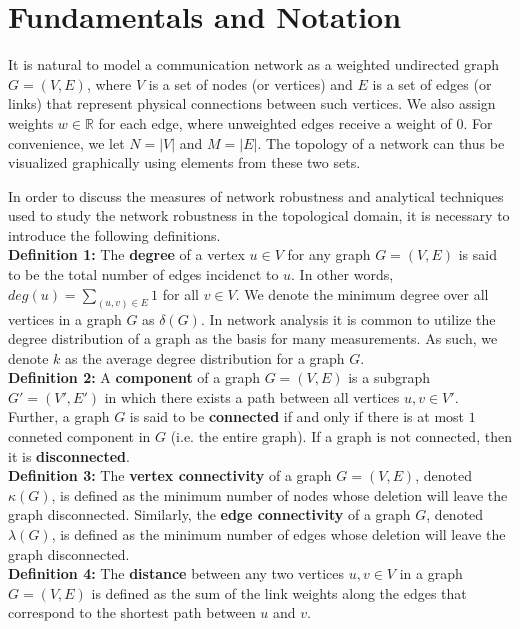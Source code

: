 \documentclass[doc]{apa}%
\begin{document}
\section{Fundamentals and Notation}
\label{Definitions}

It is natural to model a communication network as a weighted undirected graph $G = (V,E)$, where $V$ is a set of nodes (or vertices) and $E$ is a set of edges (or links) that represent physical connections between such vertices. We also assign weights $w \in \mathbb{R}$ for each edge, where unweighted edges receive a weight of $0$. For convenience, we let $N = |V|$ and $M = |E|$. The topology of a network can thus be visualized graphically using elements from these two sets. 

In order to discuss the measures of network robustness and analytical techniques used to study the network robustness in the topological domain, it is necessary to introduce the following definitions. \\

\textbf{Definition 1:}
The \textbf{degree} of a vertex $u \in V$ for any graph $G = (V,E)$ is said to be the total number of edges incidenct to $u$. In other words, $deg(u) = \sum_{(u,v) \in E} 1$ for all $v \in V$. We denote the minimum degree over all vertices in a graph $G$ as $\delta(G)$. In network analysis it is common to utilize the degree distribution of a graph as the basis for many measurements. As such, we denote $k$ as the average degree distribution for a graph $G$.\\

\textbf{Definition 2:}
A \textbf{component} of a graph $G = (V,E)$ is a subgraph $G' = (V',E')$ in which there exists a path between all vertices $u, v \in V'$. Further, a graph $G$ is said to be \textbf{connected} if and only if there is at most $1$ conneted component in $G$ (i.e. the entire graph). If a graph is not connected, then it is \textbf{disconnected}.\\

\textbf{Definition 3:}
The \textbf{vertex connectivity} of a graph $G = (V,E)$, denoted $\kappa(G)$, is defined as the minimum number of nodes whose deletion will leave the graph disconnected. Similarly, the \textbf{edge connectivity} of a graph $G$, denoted $\lambda(G)$, is defined as the minimum number of edges whose deletion will leave the graph disconnected.\\

\textbf{Definition 4:}
The \textbf{distance} between any two vertices $u, v \in V$ in a graph $G = (V,E)$ is defined as the sum of the link weights along the edges that correspond to the shortest path between $u$ and $v$.
\end{document}
